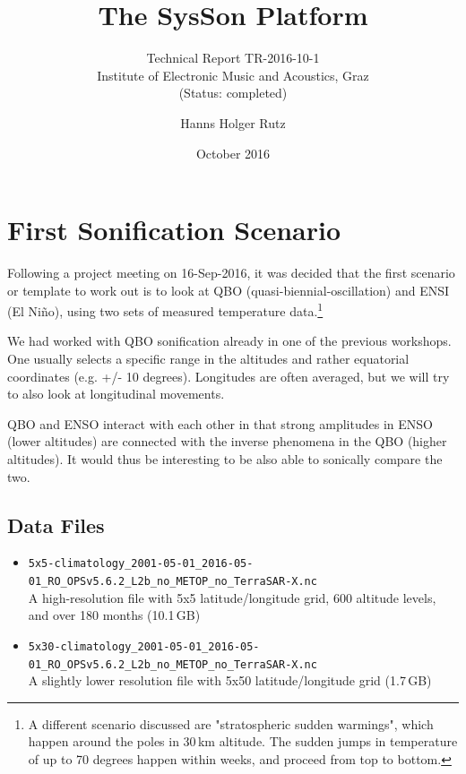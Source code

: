 \documentclass[11pt,a4paper]{article}
\title{The SysSon Platform}
\subtitle{Technical Report TR-2016-10-1\\Institute of Electronic Music and Acoustics, Graz\\(Status: completed)}
\author{Hanns Holger Rutz}
\date{October 2016}
\begin{document}
\maketitle
{}
\thispagestyle{empty}
\newpage
\section{First Sonification Scenario}

Following a project meeting on 16-Sep-2016, it was decided that the first scenario or template to work out is to look at QBO (quasi-biennial-oscillation) and ENSI (El Niño), using two sets of measured temperature data.\footnote{%
A different scenario discussed are "stratospheric sudden warmings", which happen around the poles in 30\,km altitude. The sudden jumps in temperature of up to 70 degrees happen within  weeks, and proceed from top to bottom.%
}

We had worked with QBO sonification already in one of the previous workshops. One usually selects a specific range in the altitudes and rather equatorial coordinates (e.g. +/- 10 degrees). Longitudes are often averaged, but we will try to also look at longitudinal movements.

QBO and ENSO interact with each other in that strong amplitudes in ENSO (lower altitudes) are connected with the inverse phenomena in the QBO (higher altitudes). It would thus be interesting to be also able to sonically compare the two.

\subsection{Data Files}

\begin{itemize}
\item {\small \Verb!5x5-climatology_2001-05-01_2016-05-01_RO_OPSv5.6.2_L2b_no_METOP_no_TerraSAR-X.nc!}\\A high-resolution file with 5x5 latitude/longitude grid, 600 altitude levels, and over 180 months (10.1\,GB)
\item {\small \Verb!5x30-climatology_2001-05-01_2016-05-01_RO_OPSv5.6.2_L2b_no_METOP_no_TerraSAR-X.nc!}\\A slightly lower resolution file with 5x50 latitude/longitude grid (1.7\,GB)
\end{itemize}
\end{document}
